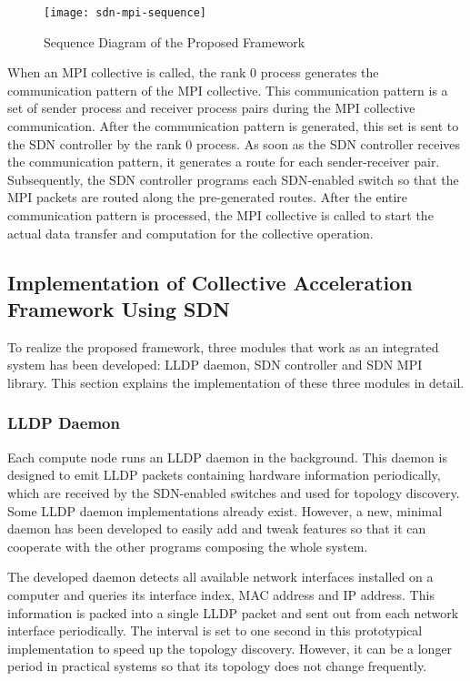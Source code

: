 \begin{figure}
    \centering
    \texttt{[image: sdn-mpi-sequence]}
    \caption{Sequence Diagram of the Proposed Framework}%
    \label{fig:proposal-sequence}
\end{figure}

When an MPI collective is called, the rank 0 process generates the
communication pattern of the MPI collective. This communication pattern is a
set of sender process and receiver process pairs during the MPI collective
communication. After the communication pattern is generated, this set is sent
to the SDN controller by the rank 0 process. As soon as the SDN controller
receives the communication pattern, it generates a route for each
sender-receiver pair. Subsequently, the SDN controller programs each
SDN-enabled switch so that the MPI packets are routed along the pre-generated
routes. After the entire communication pattern is processed, the MPI
collective is called to start the actual data transfer and computation for the
collective operation.

\subsection{Implementation of Collective Acceleration Framework Using SDN}

To realize the proposed framework, three modules that work as an integrated
system has been developed: LLDP daemon, SDN controller and SDN MPI library.
This section explains the implementation of these three modules in detail.

\subsubsection{LLDP Daemon}

Each compute node runs an LLDP daemon in the background. This daemon is
designed to emit LLDP packets containing hardware information periodically,
which are received by the SDN-enabled switches and used for topology
discovery. Some LLDP daemon implementations already exist. However, a new,
minimal daemon has been developed to easily add and tweak features so that it
can cooperate with the other programs composing the whole system.

The developed daemon detects all available network interfaces installed on a
computer and queries its interface index, MAC address and IP address.
This information is packed into a single LLDP packet and sent out from
each network interface periodically. The interval is set to one second in
this prototypical implementation to speed up the topology discovery.
However, it can be a longer period in practical systems so that its
topology does not change frequently.

